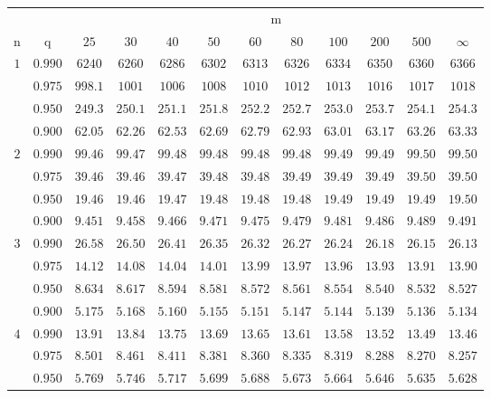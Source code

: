 \documentclass[11pt]{article}
\theoremstyle{definition}
\begin{document}
\begin{table}[H]
	\begin{tabularx}{\linewidth}{c | c | c c c c c c c c c c}
		& & \multicolumn{10}{c}{m}\\
		\cline{3-12}
		n & q & $25$ & $30$ & $40$ & $50$ & $60$ & $80$ & $100$ & $200$ & $500$ & $\infty$\\
		\hline
		$1$ & $0.990$ & $6240$ & $6260$ & $6286$ & $6302$ & $6313$ & $6326$ & $6334$ & $6350$ & $6360$ & $6366$ \\
		& $0.975$ & $998.1$ & $1001$ & $1006$ & $1008$ & $1010$ & $1012$ & $1013$ & $1016$ & $1017$ & $1018$ \\
		& $0.950$ & $249.3$ & $250.1$ & $251.1$ & $251.8$ & $252.2$ & $252.7$ & $253.0$ & $253.7$ & $254.1$ & $254.3$ \\
		& $0.900$ & $62.05$ & $62.26$ & $62.53$ & $62.69$ & $62.79$ & $62.93$ & $63.01$ & $63.17$ & $63.26$ & $63.33$ \\
		$2$ & $0.990$ & $99.46$ & $99.47$ & $99.48$ & $99.48$ & $99.48$ & $99.48$ & $99.49$ & $99.49$ & $99.50$ & $99.50$ \\
		& $0.975$ & $39.46$ & $39.46$ & $39.47$ & $39.48$ & $39.48$ & $39.49$ & $39.49$ & $39.49$ & $39.50$ & $39.50$ \\
		& $0.950$ & $19.46$ & $19.46$ & $19.47$ & $19.48$ & $19.48$ & $19.48$ & $19.49$ & $19.49$ & $19.49$ & $19.50$ \\
		& $0.900$ & $9.451$ & $9.458$ & $9.466$ & $9.471$ & $9.475$ & $9.479$ & $9.481$ & $9.486$ & $9.489$ & $9.491$ \\
		$3$ & $0.990$ & $26.58$ & $26.50$ & $26.41$ & $26.35$ & $26.32$ & $26.27$ & $26.24$ & $26.18$ & $26.15$ & $26.13$ \\
		& $0.975$ & $14.12$ & $14.08$ & $14.04$ & $14.01$ & $13.99$ & $13.97$ & $13.96$ & $13.93$ & $13.91$ & $13.90$ \\
		& $0.950$ & $8.634$ & $8.617$ & $8.594$ & $8.581$ & $8.572$ & $8.561$ & $8.554$ & $8.540$ & $8.532$ & $8.527$ \\
		& $0.900$ & $5.175$ & $5.168$ & $5.160$ & $5.155$ & $5.151$ & $5.147$ & $5.144$ & $5.139$ & $5.136$ & $5.134$ \\
		$4$ & $0.990$ & $13.91$ & $13.84$ & $13.75$ & $13.69$ & $13.65$ & $13.61$ & $13.58$ & $13.52$ & $13.49$ & $13.46$ \\
		& $0.975$ & $8.501$ & $8.461$ & $8.411$ & $8.381$ & $8.360$ & $8.335$ & $8.319$ & $8.288$ & $8.270$ & $8.257$ \\
		& $0.950$ & $5.769$ & $5.746$ & $5.717$ & $5.699$ & $5.688$ & $5.673$ & $5.664$ & $5.646$ & $5.635$ & $5.628$ \\

\end{tabularx}
\end{table}
\end{document}
